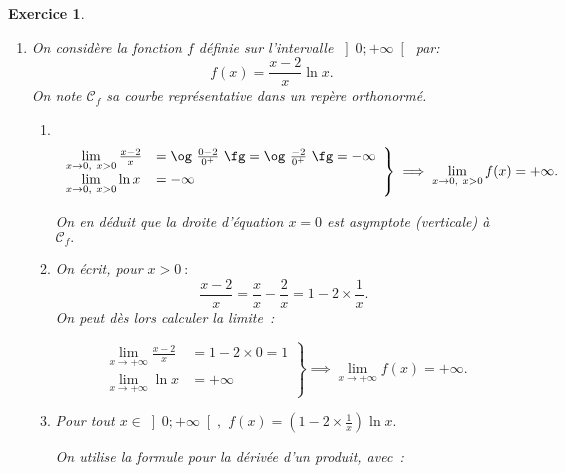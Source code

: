 \documentclass[10pt]{article}
\newtheorem{exo}{Exercice}
\begin{document}
\begin{exo}
\begin{enumerate}
\begin{enumerate}
D'après le théorème de la bijection, l'équation $g(x)=0$ a exactement une solution  $\alpha$ dans $\left]0;+\infty\right[.$

\medskip

\`A l'aide de la calculatrice, on obtient l'encadrement
\[1,37<\alpha<1,38.\]

\item On déduit des questions précédentes le tableau de signe de la fonction $g~:$ 

\medskip
\begin{center}
\end{center}

\end{enumerate}
\item On considère la fonction $f$ définie sur l'intervalle $\left]0;+\infty\right[$ par:
\[f(x) = \frac{x-2}{x}\ln x.\]
On note $\mathcal{C}_f$ sa courbe représentative dans un repère orthonormé.
\begin{enumerate}
\item ~{} \[\left.
    \begin{array}{ll}
        \lim\limits_{x\to 0,~x>0}\frac{x-2}{x}&=\og~ \frac{0-2}{0^+}~\fg=\og~ \frac{-2}{0^+}~\fg= -\infty\\
        \lim\limits_{x\to 0,~x>0}\ln x&= -\infty
    \end{array}
\right \}\implies \lim\limits_{x\to 0,~x>0}f(x)= +\infty.\]

On en déduit que la droite d'équation $x=0$ est asymptote (verticale) à $\mathcal{C}_f.$
\item On écrit, pour $x>0~:$
\[\frac{x-2}{x}=\frac{x}{x}-\frac{2}{x}=1-2\times\frac{1}{x}.\] On peut dès lors calculer la limite~:

\[\left.
    \begin{array}{ll}
        \lim\limits_{x\to +\infty}\frac{x-2}{x}&= 1-2\times 0=1\\
        \lim\limits_{x\to +\infty}\ln x&= +\infty
    \end{array}
\right \}\implies \lim\limits_{x\to +\infty}f(x)= +\infty.\]

\item Pour tout $x\in\left]0;+\infty\right[,$ $f(x)=\left(1-2\times\frac{1}{x}\right)\ln x.$

\medskip

On utilise la formule pour la dérivée d'un produit, avec~:


\end{enumerate}
\end{enumerate}
\end{exo}
\end{document}
